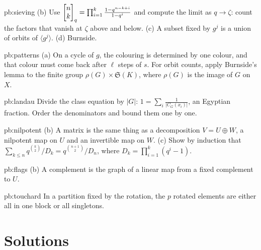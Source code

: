 \begin{hint}{pb:sieving}
(b) Use $\begin{bmatrix}n\\k\end{bmatrix}_q=\prod_{i=1}^k\frac{1-q^{n-k+i}}{1-q^i}$ and compute the limit as $q\to\zeta$: count the factors that
vanish at $\zeta$ above and below. (c) A subset fixed by $g^j$ is a union of orbits of $\langle g^j\rangle$. (d) Burnside.
\end{hint}

\begin{hint}{pb:patterns}
(a) On a cycle of $g$, the colouring is determined by one colour, and that colour must come back after $\ell$ steps of $s$.
For orbit counts, apply Burnside's lemma to the finite group $\rho(G)\times\mathfrak S(K)$, where $\rho(G)$ is the image of $G$ on $X$.
\end{hint}

\begin{hint}{pb:landau}
Divide the class equation by $|G|$: $1=\sum_i\frac1{|C_G(x_i)|}$, an Egyptian fraction. Order the denominators and bound
them one by one.
\end{hint}

\begin{hint}{pb:nilpotent}
(b) A matrix is the same thing as a decomposition $V=U\oplus W$, a nilpotent map on $U$ and an invertible map on $W$. (c) Show
by induction that $\sum_{k\le n}q^{\binom k2}/D_k=q^{\binom{n+1}2}/D_n$, where $D_k=\prod_{i=1}^k(q^i-1)$.
\end{hint}

\begin{hint}{pb:flags}
(b) A complement is the graph of a linear map from a fixed complement to $U$.
\end{hint}

\begin{hint}{pb:touchard}
In a partition fixed by the rotation, the $p$ rotated elements are either all in one block or all singletons.
\end{hint}

\section{Solutions}

